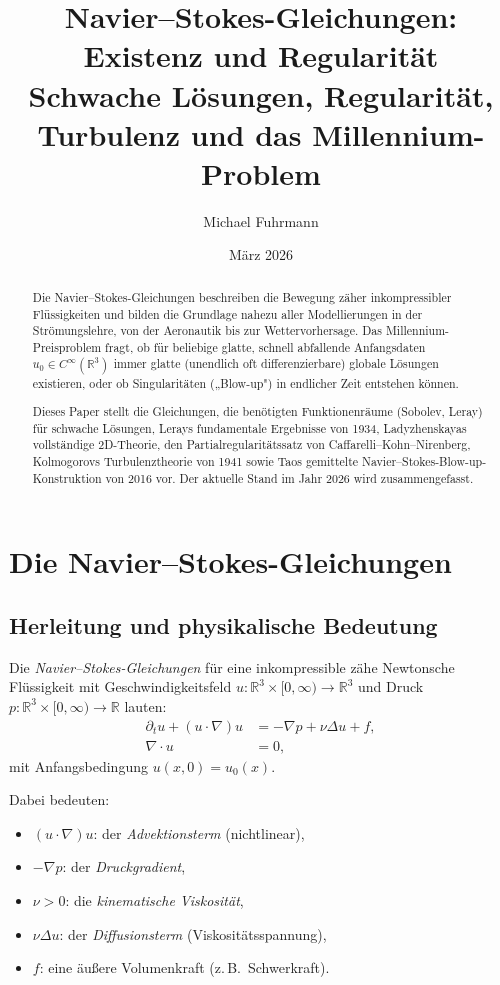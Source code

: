 \documentclass[12pt,a4paper]{article}
\title{\textbf{Navier--Stokes-Gleichungen: Existenz und Regularität}\\[0.5em]
\large Schwache Lösungen, Regularität, Turbulenz und das Millennium-Problem}
\author{Michael Fuhrmann}
\date{März 2026}
\theoremstyle{remark}
\begin{document}
\maketitle
\begin{abstract}
Die Navier--Stokes-Gleichungen beschreiben die Bewegung zäher inkompressibler Flüssigkeiten
und bilden die Grundlage nahezu aller Modellierungen in der Strömungslehre, von der
Aeronautik bis zur Wettervorhersage. Das Millennium-Preisproblem fragt, ob für beliebige
glatte, schnell abfallende Anfangsdaten $u_0 \in C^\infty(\mathbb{R}^3)$ immer glatte
(unendlich oft differenzierbare) globale Lösungen existieren, oder ob Singularitäten
(„Blow-up") in endlicher Zeit entstehen können.

Dieses Paper stellt die Gleichungen, die benötigten Funktionenräume (Sobolev, Leray) für
schwache Lösungen, Lerays fundamentale Ergebnisse von 1934, Ladyzhenskayas vollständige
2D-Theorie, den Partialregularitätssatz von Caffarelli--Kohn--Nirenberg, Kolmogorovs
Turbulenztheorie von 1941 sowie Taos gemittelte Navier--Stokes-Blow-up-Konstruktion von
2016 vor. Der aktuelle Stand im Jahr 2026 wird zusammengefasst.
\end{abstract}

\tableofcontents
\newpage

\section{Die Navier--Stokes-Gleichungen}

\subsection{Herleitung und physikalische Bedeutung}

Die \emph{Navier--Stokes-Gleichungen} für eine inkompressible zähe Newtonsche Flüssigkeit
mit Geschwindigkeitsfeld $u\colon \mathbb{R}^3 \times [0,\infty) \to \mathbb{R}^3$ und
Druck $p\colon \mathbb{R}^3 \times [0,\infty) \to \mathbb{R}$ lauten:
\begin{align}
  \partial_t u + (u \cdot \nabla)u &= -\nabla p + \nu \Delta u + f, \label{eq:ns_impuls}\\
  \nabla \cdot u &= 0, \label{eq:ns_inkompressibel}
\end{align}
mit Anfangsbedingung $u(x, 0) = u_0(x)$.

Dabei bedeuten:
\begin{itemize}[nosep]
  \item $(u \cdot \nabla)u$: der \emph{Advektionsterm} (nichtlinear),
  \item $-\nabla p$: der \emph{Druckgradient},
  \item $\nu > 0$: die \emph{kinematische Viskosität},
  \item $\nu \Delta u$: der \emph{Diffusionsterm} (Viskositätsspannung),
  \item $f$: eine äußere Volumenkraft (z.\,B.\ Schwerkraft).
\end{itemize}
\end{document}

